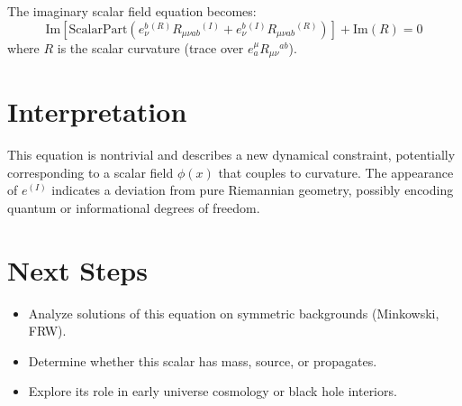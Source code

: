 \documentclass[12pt]{article}
\begin{document}
The imaginary scalar field equation becomes:
\[
\text{Im} \left[ \text{ScalarPart} \left( e^b_\nu{}^{(R)} R_{\mu\nu ab}{}^{(I)} + e^b_\nu{}^{(I)} R_{\mu\nu ab}{}^{(R)} \right) \right] + \text{Im}(R) = 0
\]
where $R$ is the scalar curvature (trace over $e^\mu_a R_{\mu\nu}{}^{ab}$).

\section*{Interpretation}

This equation is nontrivial and describes a new dynamical constraint, potentially corresponding to a scalar field $\phi(x)$ that couples to curvature. The appearance of $e^{(I)}$ indicates a deviation from pure Riemannian geometry, possibly encoding quantum or informational degrees of freedom.

\section*{Next Steps}

\begin{itemize}
\item Analyze solutions of this equation on symmetric backgrounds (Minkowski, FRW).
\item Determine whether this scalar has mass, source, or propagates.
\item Explore its role in early universe cosmology or black hole interiors.
\end{itemize}
\end{document}
